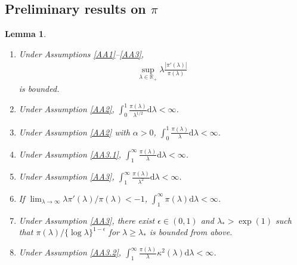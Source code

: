 \documentclass[preprint,11pt]{imsart}
\numberwithin{equation}{section}
\theoremstyle{plain}
\newtheorem{lemma}{Lemma}[section]
\theoremstyle{definition}
\theoremstyle{remark}
\newcommand{\rd}{\mathrm{d}}
\newcommand{\dps}{\displaystyle}
\begin{document}
  \subsection{Preliminary results on $\pi$}
\begin{lemma}\label{lem:pi}
 \begin{enumerate}
  \item \label{lem:pi:1}
	Under Assumptions \ref{AA1}--\ref{AA3},
\begin{align*}
 \sup_{\lambda\in\mathbb{R}_+}\lambda\frac{|\pi'(\lambda)|}{\pi(\lambda)}
\end{align*}
is bounded.
  \item \label{lem:pi:2}
	Under Assumption \ref{AA2}, $\dps\int_0^1\frac{\pi(\lambda)}{\lambda^{1/2}}\rd \lambda<\infty$.
  \item \label{lem:pi:3}
	Under Assumption \ref{AA2} with $\alpha>0$, $\dps  \int_0^1\frac{\pi(\lambda)}{\lambda}\rd \lambda<\infty$.
  \item \label{lem:pi:4}
	Under Assumption \ref{AA3.1},
	$\dps \int_1^\infty \frac{\pi(\lambda)}{\lambda}\rd \lambda<\infty$.
  \item \label{lem:pi:5}
	Under Assumption \ref{AA3}, $\dps  \int_1^\infty \frac{\pi(\lambda)}{\lambda^2}\rd \lambda<\infty$.
  \item \label{lem:pi:6}
	If $\lim_{\lambda\to\infty}\lambda\pi'(\lambda)/\pi(\lambda)<-1$,
	$\dps \int_1^\infty \pi(\lambda)\rd \lambda<\infty$.
  \item \label{lem:pi:7}
	Under Assumption \ref{AA3}, there exist $\epsilon\in(0,1)$ and $\lambda_*>\exp(1) $ such that
$\pi(\lambda)/\{\log \lambda\}^{1-\epsilon}$
for $\lambda\geq \lambda_*$ is bounded from above.
  \item \label{lem:pi:8} Under Assumption \ref{AA3.2},
	$\dps \int_1^\infty \frac{\pi(\lambda)}{\lambda}\kappa^2(\lambda)\rd \lambda<\infty$.
 \end{enumerate}
\end{lemma}
\end{document}
